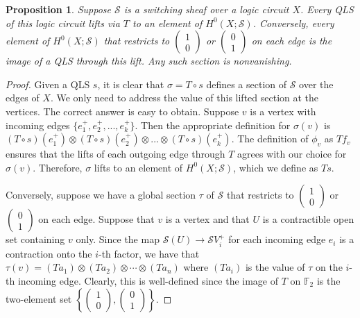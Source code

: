 \documentclass{amsart}
\theoremstyle{plain}
\newtheorem{prop}[thm]{Proposition}
\theoremstyle{definition}
\begin{document}
\begin{prop}
\label{qls_subset_h0_prop}
Suppose $\mathcal{S}$ is a switching sheaf over a logic circuit $X$.
Every QLS of this logic circuit lifts via $T$ to an element of
$H^0(X;\mathcal{S})$.  Conversely, every element of
$H^0(X;\mathcal{S})$ that restricts to
$\left(\begin{smallmatrix}1\\0\end{smallmatrix}\right)$ or
  $\left(\begin{smallmatrix}0\\1\end{smallmatrix}\right)$ on each edge is the image of a
    QLS through this lift.  Any such section is nonvanishing.
\end{prop}
\begin{proof}
Given a QLS $s$, it is clear that $\sigma = T \circ s$ defines a section of
$\mathcal{S}$ over the edges of $X$.  We only need to address the
value of this lifted section at the vertices.  The correct answer is
easy to obtain.  Suppose $v$ is a vertex with incoming edges
$\{e^+_1,e^+_2,...,e^+_k\}$.  Then the appropriate definition for $\sigma(v)$
is $(T \circ s)(e^+_1) \otimes (T \circ s)(e^+_2) \otimes ... \otimes (T
\circ s)(e^+_k)$.  The definition of $\phi_v$ as $T f_v$ ensures that
the lifts of each outgoing edge through $T$ agrees with our choice for
$\sigma(v)$.  Therefore, $\sigma$ lifts to an element of
$H^0(X;\mathcal{S})$, which we define as $Ts$.

Conversely, suppose we have a global section $\tau$ of $\mathcal{S}$
that restricts to $\left(\begin{smallmatrix}1\\0\end{smallmatrix}\right)$ or
  $\left(\begin{smallmatrix}0\\1\end{smallmatrix}\right)$ on each edge.  Suppose that $v$
    is a vertex and that $U$ is a contractible open set containing $v$
    only.  Since the map $\mathcal{S}(U) \to \mathcal{S}{V^+_i}$ for
    each incoming edge $e_i$ is a contraction onto the $i$-th factor,
    we have that $\tau(v) = (Ta_1)\otimes (Ta_2) \otimes \cdots \otimes
    (Ta_n)$ where $(Ta_i)$ is the value of $\tau$ on the $i$-th
    incoming edge.  Clearly, this is well-defined since the image of
    $T$ on $\mathbb{F}_2$ is the two-element set
    $\left\{\left(\begin{smallmatrix}1\\0\end{smallmatrix}\right),
  \left(\begin{smallmatrix}0\\1\end{smallmatrix}\right)\right\}$. 


\end{proof}
\end{document}

